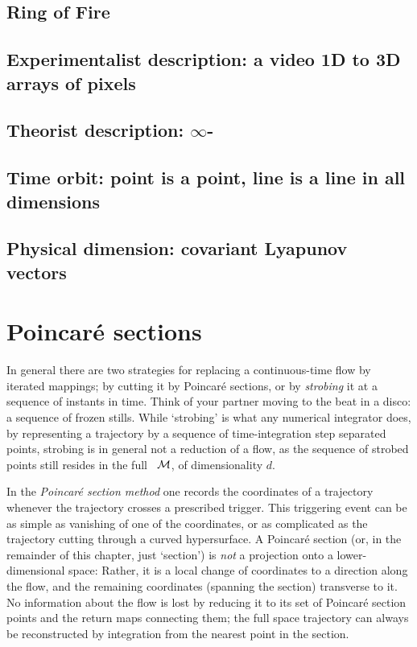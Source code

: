 \subsection{\cLe}
\subsection{Ring of Fire}
\subsection{Experimentalist description: a video 1D to 3D arrays of pixels}
\subsection{Theorist description: $\infty$-\dmn\ \statesp}
\subsection{Time orbit: point is a point, line is a line in all dimensions}
\label{sect:TimeOrb}

\subsection{Physical dimension: covariant Lyapunov vectors}

\section{Poincar\'e sections}
\label{s:cut}

In general there are two strategies for replacing a continuous-time flow
by iterated mappings; by cutting it by Poincar\'e sections, or by
\emph{strobing} it at a sequence of instants in time. Think of your
partner moving to the beat in a disco: a sequence of frozen stills. While
`strobing' is what any numerical integrator does, by representing a
trajectory by a sequence of time-integration step separated points,
strobing is in general not a reduction of a flow, as the sequence of
strobed points still resides in the full \statesp\ ${\cal M}$, of
dimensionality $d$.

In the {\em Poincar\'e section method} one records the coordinates of a
trajectory whenever the trajectory crosses a prescribed trigger. This
triggering event can be as simple as vanishing of one of the coordinates,
or as complicated as the trajectory cutting through a curved
hypersurface. A Poincar\'e section (or, in the remainder of this chapter,
just `section') is {\em not} a projection onto a lower-dimensional space:
Rather, it is a local change of coordinates to a direction along the
flow, and the remaining coordinates (spanning the section) transverse to
it. No information about the flow is lost by reducing it to its set of
Poincar\'e section points and the return maps connecting them; the full
space trajectory can always be reconstructed by integration from the
nearest point in the section.


